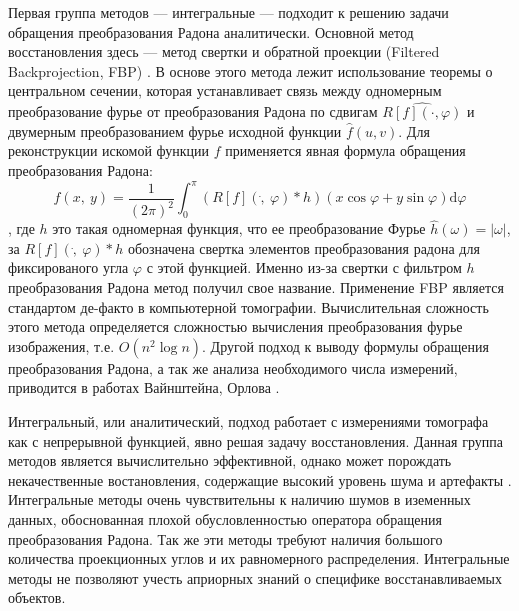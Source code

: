 Первая группа методов --- интегральные \cite{herman2013mathematical, hsieh2009computed, zou2004exact, feldkamp1984practical}  --- подходит к решению задачи обращения преобразования Радона аналитически. 
Основной метод восстановления здесь --- метод свертки и обратной проекции (Filtered Backprojection, FBP) \cite{buzug2008computed}.
В основе этого метода лежит использование теоремы о центральном сечении, которая устанавливает связь между одномерным преобразование фурье от преобразования Радона по сдвигам $\hat{R[f](\cdot, \varphi)}$ и двумерным преобразованием фурье исходной функции $\hat{f}(u, v)$.
Для реконструкции искомой функции $f$ применяется явная формула обращения преобразования Радона:
$$
f(x,\ y) = \frac {1} {(2 \pi)^2} \int_0^\pi {
  \left(R[f](\dot,\ \varphi) * h\right)(x \cos \varphi + y \sin \varphi)
} \mathrm d \varphi
$$,
где $h$ это такая одномерная функция, что ее преобразование Фурье $\hat{h}(\omega) = |\omega|$, за $R[f](\dot,\ \varphi) * h$ обозначена свертка элементов преобразования радона для фиксированого угла $\varphi$ с этой функцией.
Именно из-за свертки с фильтром $h$ преобразования Радона метод получил свое название.
Применение FBP является стандартом де-факто в компьютерной томографии.
Вычислительная сложность этого метода определяется сложностью вычисления преобразования фурье изображения, т.е. $O(n^2 \log n)$.
Другой подход к выводу формулы обращения преобразования Радона, а так же анализа необходимого числа измерений, приводится в работах Вайнштейна, Орлова \cite{vainstein_orlov, orlov}.

Интегральный, или аналитический, подход работает с измерениями томографа как с непрерывной функцией, явно решая задачу восстановления.
Данная группа методов является вычислительно эффективной, однако может порождать некачественные востановления, содержащие высокий уровень шума и артефакты \cite{Lucas_sota_ir_survey_2015_radiology}.
Интегральные методы очень чувствительны к наличию шумов в иземенных данных, обоснованная плохой обусловленностью оператора обращения преобразования Радона. 
Так же эти методы требуют наличия большого количества проекционных углов и их равномерного распределения.
Интегральные методы не позволяют учесть априорных знаний о специфике восстанавливаемых объектов.


